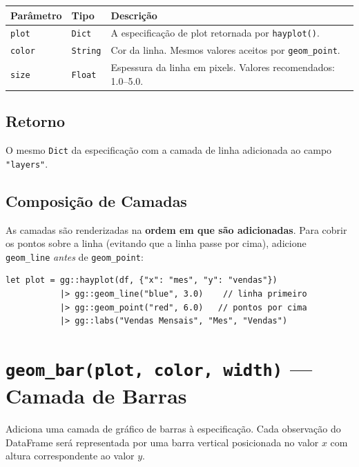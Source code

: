 \documentclass[12pt, a4paper, oneside]{book}
\newcommand{\code}[1]{\texttt{#1}}
\begin{document}
\begin{tabularx}{\textwidth}{@{}lL{2.5cm}X@{}}
  \toprule
  \textbf{Parâmetro} & \textbf{Tipo} & \textbf{Descrição} \\
  \midrule
  \code{plot}  & \code{Dict}   & A especificação de plot retornada por \code{hayplot()}. \\[4pt]
  \code{color} & \code{String} & Cor da linha. Mesmos valores aceitos por \code{geom\_point}. \\[4pt]
  \code{size}  & \code{Float}  & Espessura da linha em pixels. Valores recomendados: 1.0--5.0. \\
  \bottomrule
\end{tabularx}

\subsection*{Retorno}

O mesmo \code{Dict} da especificação com a camada de linha adicionada ao
campo \code{"layers"}.

\subsection*{Composição de Camadas}

As camadas são renderizadas na \textbf{ordem em que são adicionadas}. Para
cobrir os pontos sobre a linha (evitando que a linha passe por cima),
adicione \code{geom\_line} \emph{antes} de \code{geom\_point}:

\begin{lstlisting}[caption={Gráfico de linha com marcadores de pontos}]
let plot = gg::hayplot(df, {"x": "mes", "y": "vendas"})
           |> gg::geom_line("blue", 3.0)    // linha primeiro
           |> gg::geom_point("red", 6.0)   // pontos por cima
           |> gg::labs("Vendas Mensais", "Mes", "Vendas")
\end{lstlisting}

\section{\texttt{geom\_bar(plot, color, width)} --- Camada de Barras}

Adiciona uma camada de gráfico de barras à especificação. Cada observação
do DataFrame será representada por uma barra vertical posicionada no valor $x$
com altura correspondente ao valor $y$.
\end{document}
